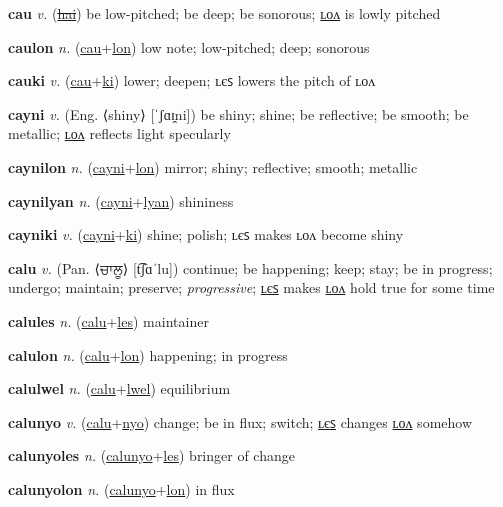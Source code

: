 \textbf{\hypertarget{cau}{cau}} \textit{v.} (\hyperlink{hai}{\sout{hai}})
be low-pitched; be deep; be sonorous; \hyperlink{caulon}{ʟᴏᴧ} is lowly pitched

\textbf{\hypertarget{caulon}{caulon}} \textit{n.} (\hyperlink{cau}{cau}+\allowbreak \hyperlink{lon}{lon})
low note; low-pitched; deep; sonorous

\textbf{\hypertarget{cauki}{cauki}} \textit{v.} (\hyperlink{cau}{cau}+\allowbreak \hyperlink{ki}{ki})
lower; deepen; ʟєꜱ lowers the pitch of ʟᴏᴧ

\textbf{\hypertarget{cayni}{cayni}} \textit{v.} (Eng. ⟨shiny⟩ [ˈʃɑɪ̯ni])
be shiny; shine; be reflective; be smooth; be metallic; \hyperlink{caynilon}{ʟᴏᴧ} reflects light specularly

\textbf{\hypertarget{caynilon}{caynilon}} \textit{n.} (\hyperlink{cayni}{cayni}+\allowbreak \hyperlink{lon}{lon})
mirror; shiny; reflective; smooth; metallic

\textbf{\hypertarget{caynilyan}{caynilyan}} \textit{n.} (\hyperlink{cayni}{cayni}+\allowbreak \hyperlink{lyan}{lyan})
shininess

\textbf{\hypertarget{cayniki}{cayniki}} \textit{v.} (\hyperlink{cayni}{cayni}+\allowbreak \hyperlink{ki}{ki})
shine; polish; ʟєꜱ makes ʟᴏᴧ become shiny

\textbf{\hypertarget{calu}{calu}} \textit{v.} (Pan. ⟨{\gurmukhi{}ਚਾਲੂ}⟩ [t͡ʃɑˈlu])
continue; be happening; keep; stay; be in progress; undergo; maintain; preserve; \textit{progressive}; \hyperlink{calules}{ʟєꜱ} makes \hyperlink{calulon}{ʟᴏᴧ} hold true for some time

\textbf{\hypertarget{calules}{calules}} \textit{n.} (\hyperlink{calu}{calu}+\allowbreak \hyperlink{les}{les})
maintainer

\textbf{\hypertarget{calulon}{calulon}} \textit{n.} (\hyperlink{calu}{calu}+\allowbreak \hyperlink{lon}{lon})
happening; in progress

\textbf{\hypertarget{calulwel}{calulwel}} \textit{n.} (\hyperlink{calu}{calu}+\allowbreak \hyperlink{lwel}{lwel})
equilibrium

\textbf{\hypertarget{calunyo}{calunyo}} \textit{v.} (\hyperlink{calu}{calu}+\allowbreak \hyperlink{nyo}{nyo})
change; be in flux; switch; \hyperlink{calunyoles}{ʟєꜱ} changes \hyperlink{calunyolon}{ʟᴏᴧ} somehow

\textbf{\hypertarget{calunyoles}{calunyoles}} \textit{n.} (\hyperlink{calunyo}{calunyo}+\allowbreak \hyperlink{les}{les})
bringer of change

\textbf{\hypertarget{calunyolon}{calunyolon}} \textit{n.} (\hyperlink{calunyo}{calunyo}+\allowbreak \hyperlink{lon}{lon})
in flux

